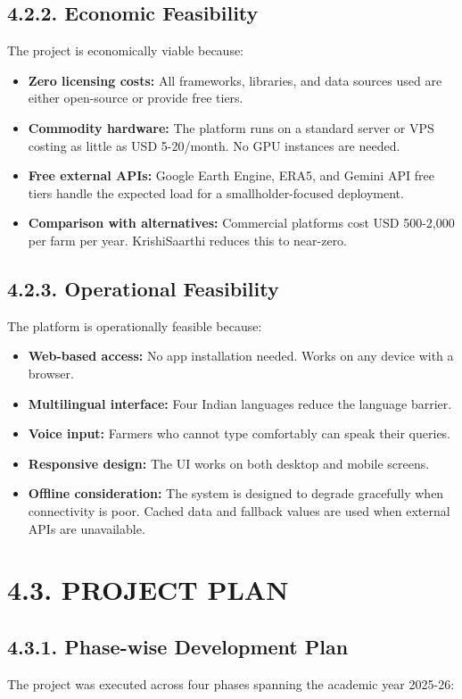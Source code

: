 \documentclass[12pt, a4paper]{report}
\begin{document}
\subsection{4.2.2. Economic Feasibility}
The project is economically viable because:

\begin{itemize}[leftmargin=*]
  \item \textbf{Zero licensing costs:} All frameworks, libraries, and data sources used are either open-source or provide free tiers.
  \item \textbf{Commodity hardware:} The platform runs on a standard server or VPS costing as little as USD 5-20/month. No GPU instances are needed.
  \item \textbf{Free external APIs:} Google Earth Engine, ERA5, and Gemini API free tiers handle the expected load for a smallholder-focused deployment.
  \item \textbf{Comparison with alternatives:} Commercial platforms cost USD 500-2,000 per farm per year. KrishiSaarthi reduces this to near-zero.
\end{itemize}
\subsection{4.2.3. Operational Feasibility}
The platform is operationally feasible because:

\begin{itemize}[leftmargin=*]
  \item \textbf{Web-based access:} No app installation needed. Works on any device with a browser.
  \item \textbf{Multilingual interface:} Four Indian languages reduce the language barrier.
  \item \textbf{Voice input:} Farmers who cannot type comfortably can speak their queries.
  \item \textbf{Responsive design:} The UI works on both desktop and mobile screens.
  \item \textbf{Offline consideration:} The system is designed to degrade gracefully when connectivity is poor. Cached data and fallback values are used when external APIs are unavailable.
\end{itemize}
\section{4.3. PROJECT PLAN}
\subsection{4.3.1. Phase-wise Development Plan}
The project was executed across four phases spanning the academic year 2025-26:
\end{document}
